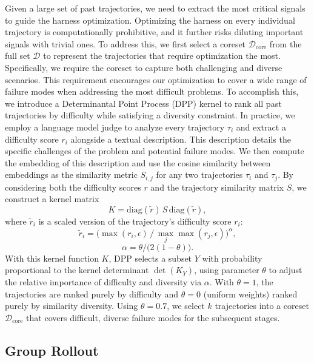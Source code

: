 \documentclass{llmxive}
\begin{document}
Given a large set of past trajectories, we need to extract the most critical signals to guide the harness optimization.
Optimizing the harness on every individual trajectory is computationally prohibitive, and it further risks diluting important signals with trivial ones.
To address this, we first select a coreset $\mathcal{D}_{\mathrm{core}}$ from the full set $\mathcal{D}$ to represent the trajectories that require optimization the most.
Specifically, we require the coreset to capture both challenging and diverse scenarios.
This requirement encourages our optimization to cover a wide range of failure modes when addressing the most difficult problems.
To accomplish this, we introduce a Determinantal Point Process (DPP) kernel \citep{kulesza2012dpp} to rank all past trajectories by difficulty while satisfying a diversity constraint.
In practice, we employ a language model judge to analyze every trajectory $\tau_i$ and extract a difficulty score $r_i$ alongside a textual description.
This description details the specific challenges of the problem and potential failure modes.
We then compute the embedding of this description and use the cosine similarity between embeddings as the similarity metric $S_{i,j}$ for any two trajectories $\tau_i$ and $\tau_j$.
By considering both the difficulty scores $r$ and the trajectory similarity matrix $S$, we construct a kernel matrix
\[
    K = \mathrm{diag}( \widetilde{r})\,S\,\mathrm{diag}( \widetilde{r}),
\]
where  $\widetilde{r}_i$ is a scaled version of the trajectory's difficulty score $r_i$:
\[
\widetilde{r}_i = \big(\max(r_i,\epsilon)\,/\,\max_j \max(r_j,\epsilon)\big)^{\alpha},
\]
\[
\alpha = \theta/\big(2(1-\theta)\big).
\]
With this kernel function $K$, DPP selects a subset $Y$ with probability proportional to the kernel determinant $\det(K_Y)$, using parameter $\theta$ to adjust the relative importance of difficulty and diversity via $\alpha$. With $\theta = 1$, the trajectories are ranked purely by difficulty and $\theta = 0$ (uniform weights) ranked purely by similarity diversity.
Using $\theta = 0.7$, we select $k$ trajectories into a coreset $\mathcal{D}_{\mathrm{core}}$ that covers difficult, diverse failure modes for the subsequent stages.

\subsection{Group Rollout}
\end{document}
